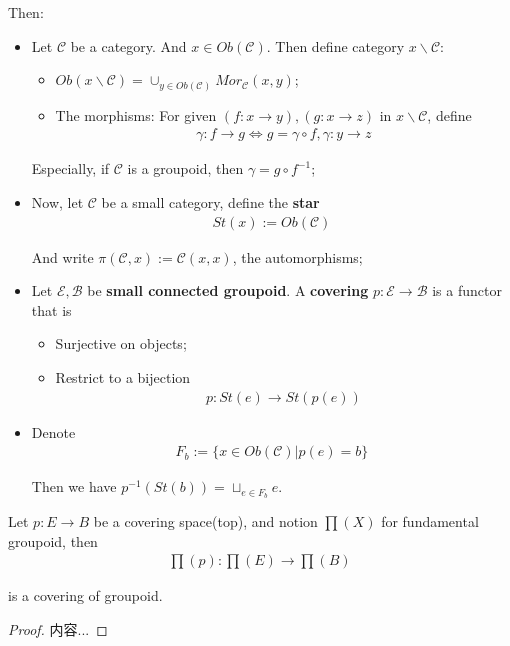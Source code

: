 \documentclass[Total.tex]{subfiles}
\begin{document}
			Then:
			\begin{Def}
				\begin{itemize}
					\item Let $\mathcal{C}$ be a category. And $x\in Ob(\mathcal{C})$. Then define category $x\backslash \mathcal{C}$:
					\begin{itemize}
						\item $Ob(x\backslash \mathcal{C})=\cup_{y\in Ob(\mathcal{C})} Mor_\mathcal{C}(x,y)$;
						\item The morphisms: For given $(f:x\rightarrow y),(g:x\rightarrow z)$ in $x\backslash \mathcal{C}$, define
						\begin{gather*}
							\gamma:f\rightarrow g\Leftrightarrow g=\gamma\circ f,\gamma:y\rightarrow z
						\end{gather*}
					\end{itemize}
					
					Especially, if $\mathcal{C}$ is a groupoid, then $\gamma=g\circ f^{-1}$;
					\item Now, let $\mathcal{C}$ be a small category, define the \textbf{star}
					\begin{gather*}
						St(x):=Ob(\mathcal{C})
					\end{gather*}
					
					And write $\pi(\mathcal{C},x):=\mathcal{C}(x,x)$, the automorphisms;
					\item Let $\mathscr E,\mathscr B$ be \textbf{small connected groupoid}. A \textbf{covering} $p:\mathscr E\rightarrow
					 \mathscr B$ is a functor that is 
					 \begin{itemize}
					 	\item Surjective on objects;
					 	\item Restrict to a bijection 
					 	\begin{gather*}
					 		p:St(e)\rightarrow St(p(e))
					 	\end{gather*}
					 \end{itemize}
					 
					 \item Denote
					 \begin{gather*}
					 	F_b:=\{x\in Ob(\mathcal{C})|p(e)=b\}
					 \end{gather*}
					 
					 Then we have $p^{-1}(St(b))=\sqcup_{e\in F_b} e$.
				\end{itemize}
			\end{Def}
			
			\begin{proposition}
				Let $p:E\rightarrow B$ be a covering space(top), and notion $\prod(X)$ for fundamental groupoid, then
				\begin{gather*}
					\prod(p):\prod(E)\rightarrow \prod (B)
				\end{gather*}
				
				is a covering of groupoid.
			\end{proposition}
			\begin{proof}
				内容...
			\end{proof}
			
\end{document}
